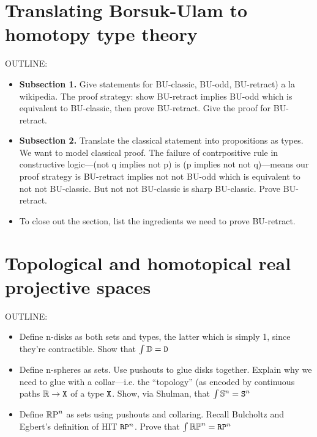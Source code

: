\documentclass{amsart}
\begin{document}
\section{Translating Borsuk-Ulam to homotopy type theory}
\label{sec:bu-to-hott}

OUTLINE:
\begin{itemize}
\item
  \textbf{Subsection 1.} Give statements for BU-classic,
  BU-odd, BU-retract) a la wikipedia. The proof strategy:
  show BU-retract implies BU-odd which is equivalent to
  BU-classic, then prove BU-retract. Give the proof for
  BU-retract.
\item
  \textbf{Subsection 2.} Translate the classical statement
  into propositions as types. We want to model classical proof.
  The failure of contrpositive rule in constructive
  logic---(not q implies not p) is (p implies not not
  q)---means our proof strategy is BU-retract implies not
  not BU-odd which is equivalent to not not BU-classic. But
  not not BU-classic is sharp BU-classic. Prove BU-retract. 
\item
  To close out the section, list the ingredients we need to
  prove BU-retract.
\end{itemize}


\section{Topological and homotopical real projective spaces}
\label{sec:rpn}

OUTLINE:
\begin{itemize}
\item
  Define n-disks as both sets and types, the latter which is
  simply 1, since they're contractible. Show that $ \int
  \mathbb{D} = \mathtt{D} $
\item
  Define n-spheres as sets.  Use pushouts to glue
  disks together. Explain why we need to glue with a
  collar---i.e. the ``topology'' (as encoded by continuous
  paths $ \mathbb{R} \to \mathtt{X} $ of a type $ \mathtt{X} $. Show, via Shulman,
  that $ \int \mathbb{S}^n = \mathtt{S}^n $
\item
  Define $ \mathbb{R}\textrm{P}^n $ as sets using pushouts and collaring.
  Recall Bulcholtz and Egbert's definition of HIT $ \mathtt{RP}^n
  $. Prove that $ \int \mathbb{RP}^n = \mathtt{RP}^n $
\end{itemize}
\end{document}
